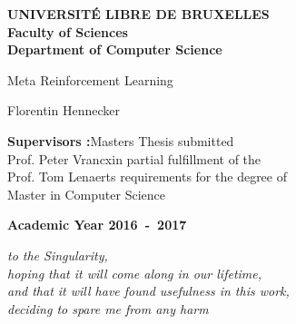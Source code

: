 \documentclass[11pt,a4paper,oneside]{book}
\begin{document}

\frontmatter
\begin{titlepage}
\begin{center}
\textbf{UNIVERSIT\'E LIBRE DE BRUXELLES}\\
\textbf{Faculty of Sciences}\\
\textbf{Department of Computer Science}
\vfill{}\vfill{}

{\Huge  Meta Reinforcement Learning}

{\Huge \par}
\begin{center}{\LARGE Florentin Hennecker}\end{center}{\Huge \par}
\vfill{}\vfill{}
\begin{flushright}{\large \textbf{Supervisors :}}\hfill{}{\large Masters Thesis submitted}\\
{\large Prof. Peter Vrancx}\hfill{}{\large in partial fulfillment of the}\\
{\large Prof. Tom Lenaerts}
\hfill{}{\large requirements for the degree of}\\
\hfill{}{\large Master in Computer Science}\end{flushright}{\large\par}
\vfill{}\vfill{}\enlargethispage{3cm}
\textbf{Academic Year 2016~-~2017}
\end{center}
\end{titlepage}
\newpage
\thispagestyle{empty} 
\null


\newenvironment{vcenterpage}
{\newpage\thispagestyle{empty} 
\vspace*{\fill}}
{\vspace*{\fill}\par\pagebreak}

\begin{vcenterpage}
\begin{flushright}
    \large\em\null\vskip1in 
    to the Singularity, \\
    hoping that it will come along in our lifetime,\\
    and that it will have found usefulness in this work,\\
	deciding to spare me from any harm\vfill
\end{flushright}
\end{vcenterpage}
\thispagestyle{empty}
\vspace*{5cm}
\end{document}
